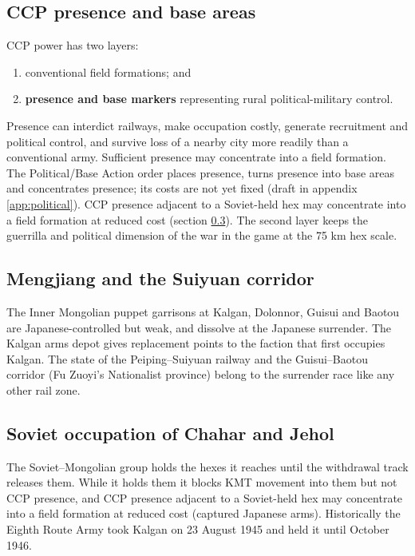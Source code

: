 \documentclass[11pt]{article}
\begin{document}
\subsection{CCP presence and base areas}\label{sub:presence}
CCP power has two layers:
\begin{enumerate}
\item conventional field formations; and
\item \textbf{presence and base markers} representing rural political-military control.
\end{enumerate}
Presence can interdict railways, make occupation costly, generate recruitment and political control, and survive loss of a nearby city more readily than a conventional army. Sufficient presence may concentrate into a field formation. The Political/Base Action order places presence, turns presence into base areas and concentrates presence; its costs are not yet fixed (draft in appendix \ref{app:political}). CCP presence adjacent to a Soviet-held hex may concentrate into a field formation at reduced cost (section \ref{sub:soviet-occupation}). The second layer keeps the guerrilla and political dimension of the war in the game at the 75 km hex scale.

\subsection{Mengjiang and the Suiyuan corridor}\label{sub:mengjiang}
The Inner Mongolian puppet garrisons at Kalgan, Dolonnor, Guisui and Baotou are Japanese-controlled but weak, and dissolve at the Japanese surrender. The Kalgan arms depot gives replacement points to the faction that first occupies Kalgan. The state of the Peiping--Suiyuan railway and the Guisui--Baotou corridor (Fu Zuoyi's Nationalist province) belong to the surrender race like any other rail zone.

\subsection{Soviet occupation of Chahar and Jehol}\label{sub:soviet-occupation}
The Soviet--Mongolian group holds the hexes it reaches until the withdrawal track releases them. While it holds them it blocks KMT movement into them but not CCP presence, and CCP presence adjacent to a Soviet-held hex may concentrate into a field formation at reduced cost (captured Japanese arms). Historically the Eighth Route Army took Kalgan on 23 August 1945 and held it until October 1946.
\end{document}
